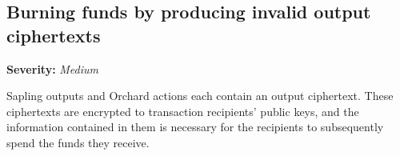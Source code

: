 \documentclass[10pt,titlepage]{article}
\newcommand{\MediumIssue}{\textcolor{darkyellow}{\emph{Medium}}}
\begin{document}
% 
% 
% 
% 
\subsection{Burning funds by producing invalid output ciphertexts} \label{issueinvalidciphertexts}
\textbf{Severity:} \MediumIssue

Sapling outputs and Orchard actions each contain an output ciphertext. These
ciphertexts are encrypted to transaction recipients' public keys, and the
information contained in them is necessary for the recipients to subsequently
spend the funds they receive.
\end{document}
